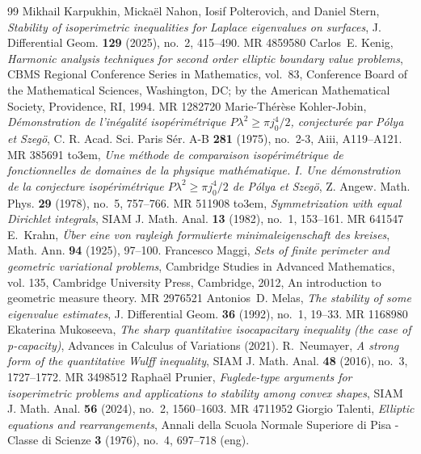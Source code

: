 \documentclass[10pt,a4paper]{amsart}
\numberwithin{equation}{section}
\providecommand{\bysame}{\leavevmode\hbox to3em{\hrulefill}\thinspace}
\providecommand{\MR}{\relax\ifhmode\unskip\space\fi MR }
\begin{document}
\begin{thebibliography}{99}
 Mikhail Karpukhin, Micka\"el Nahon, Iosif Polterovich, and Daniel Stern, \emph{Stability of isoperimetric inequalities for {L}aplace eigenvalues on surfaces}, J. Differential Geom. \textbf{129} (2025), no.~2, 415--490. \MR{4859580}
 Carlos~E. Kenig, \emph{Harmonic analysis techniques for second order elliptic boundary value problems}, CBMS Regional Conference Series in Mathematics, vol.~83, Conference Board of the Mathematical Sciences, Washington, DC; by the American Mathematical Society, Providence, RI, 1994. \MR{1282720}
 Marie-Th\'{e}r\`ese Kohler-Jobin, \emph{D\'{e}monstration de l'in\'{e}galit\'{e} isop\'{e}rim\'{e}trique {$P\lambda ^{2}\geq \pi j^{4}_{0}/2$}, conjectur\'{e}e par {P}\'{o}lya et {S}zeg\"{o}}, C. R. Acad. Sci. Paris S\'{e}r. A-B \textbf{281} (1975), no.~2-3, Aiii, A119--A121. \MR{385691}
 \bysame, \emph{Une m\'{e}thode de comparaison isop\'{e}rim\'{e}trique de fonctionnelles de domaines de la physique math\'{e}matique. {I}. {U}ne d\'{e}monstration de la conjecture isop\'{e}rim\'{e}trique {$P\lambda ^{2}\geq \pi j^{4}_{0}/2$} de {P}\'{o}lya et {S}zeg\"{o}}, Z. Angew. Math. Phys. \textbf{29} (1978), no.~5, 757--766. \MR{511908}
 \bysame, \emph{Symmetrization with equal {D}irichlet integrals}, SIAM J. Math. Anal. \textbf{13} (1982), no.~1, 153--161. \MR{641547}
 E.~Krahn, \emph{\"{U}ber eine von rayleigh formulierte minimaleigenschaft des kreises}, Math. Ann. \textbf{94} (1925), 97--100.
 Francesco Maggi, \emph{Sets of finite perimeter and geometric variational problems}, Cambridge Studies in Advanced Mathematics, vol. 135, Cambridge University Press, Cambridge, 2012, An introduction to geometric measure theory. \MR{2976521}
 Antonios~D. Melas, \emph{The stability of some eigenvalue estimates}, J. Differential Geom. \textbf{36} (1992), no.~1, 19--33. \MR{1168980}
 Ekaterina Mukoseeva, \emph{The sharp quantitative isocapacitary inequality (the case of p-capacity)}, Advances in Calculus of Variations (2021).
 R.~Neumayer, \emph{A strong form of the quantitative {W}ulff inequality}, SIAM J. Math. Anal. \textbf{48} (2016), no.~3, 1727--1772. \MR{3498512}
 Rapha\"el Prunier, \emph{Fuglede-type arguments for isoperimetric problems and applications to stability among convex shapes}, SIAM J. Math. Anal. \textbf{56} (2024), no.~2, 1560--1603. \MR{4711952}
 Giorgio Talenti, \emph{Elliptic equations and rearrangements}, Annali della Scuola Normale Superiore di Pisa - Classe di Scienze \textbf{3} (1976), no.~4, 697--718 (eng).
\end{thebibliography}
\end{document}
